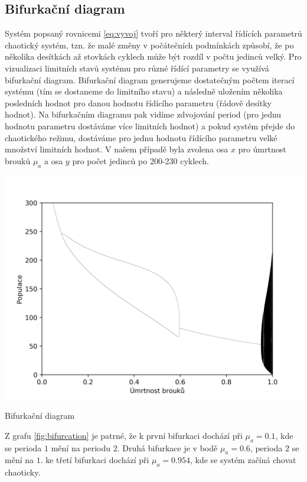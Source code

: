 \documentclass[a4paper, 12pt]{article}
\newlength\figureheight
\newlength\figurewidth
\begin{document}
\subsection{Bifurkační diagram}
Systém popsaný rovnicemi \ref{eq:vyvoj} tvoří pro některý interval řídících parametrů chaotický systém, tzn. že malé změny v počátečních podmínkách způsobí, že po několika desítkách až stovkách cyklech může být rozdíl v počtu jedinců velký. Pro vizualizaci limitních stavů systému pro různé řídící parametry se využívá bifurkační diagram. Bifurkační diagram generujeme dostatečným počtem iterací systému (tím se dostaneme do limitního stavu) a následně uložením několika posledních hodnot pro danou hodnotu řídícího parametru (řádově desítky hodnot). Na bifurkačním diagramu pak vidíme zdvojování period (pro jednu hodnotu parametru dostáváme více limitních hodnot) a pokud systém přejde do chaotického režimu, dostáváme pro jednu hodnotu řídícího parametru velké množství limitních hodnot. V našem případě byla zvolena osa $x$ pro úmrtnost brouků $\mu_a$ a osa $y$ pro počet jedinců po 200-230 cyklech.
\begin{graph}[H]
	\centering
\includegraphics[width=\textwidth]{grafy/bifurcation.png}
\vspace{-10pt}
\caption{Bifurkační diagram}
\label{fig:bifurcation}
\end{graph}

Z grafu \ref{fig:bifurcation} je patrné, že k první bifurkaci dochází při $\mu_a=0.1$, kde se perioda $1$ mění na periodu $2$. Druhá bifurkace je v bodě $\mu_a=0.6$, perioda $2$ se mění na $1$. ke třetí bifurkaci dochází při $\mu_a=0.954$, kde se systém začíná chovat chaoticky.
\end{document}
